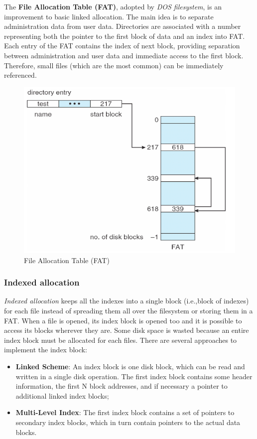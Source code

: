 The \textbf{File Allocation Table (FAT)}, adopted by \emph{DOS filesystem}, is an improvement to basic linked allocation. The main idea is to separate administration data from user data. Directories are associated with a number representing both the pointer to the first block of data and an index into FAT. Each entry of the FAT contains the index of next block, providing separation between administration and user data and immediate access to the first block. Therefore, small files (which are the most common) can be immediately referenced.

\begin{figure}[hbtp]
\centering
\includegraphics[scale=0.35]{images/file_system/fat.png}
\caption{File Allocation Table (FAT)}
\end{figure}

\subsubsection{Indexed allocation}
\emph{Indexed allocation} keeps all the indexes into a single block (i.e.,\@ block of indexes) for each file instead of spreading them all over the filesystem or storing them in a FAT. When a file is opened, its index block is opened too and it is possible to access its blocks wherever they are. Some disk space is wasted because an entire index block must be allocated for each files. There are several approaches to implement the index block:
\begin{itemize}
\item \textbf{Linked Scheme}: An index block is one disk block, which can be read and written in a single disk operation. The first index block contains some header information, the first N block addresses, and if necessary a pointer to additional linked index blocks;
\item \textbf{Multi-Level Index}: The first index block contains a set of pointers to secondary index blocks, which in turn contain pointers to the actual data blocks.
\end{itemize}

